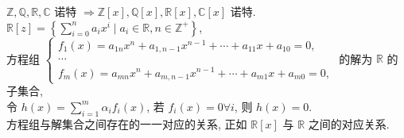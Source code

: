 \documentclass{note}
\begin{document}
\begin{eg}
    $\mathbb{Z},\mathbb{Q},\mathbb{R},\mathbb{C}$ 诺特 $\Longrightarrow\mathbb{Z}[x],\mathbb{Q}[x],\mathbb{R}[x],\mathbb{C}[x]$ 诺特.\\
    $\mathbb{R}[z]=\left\{\sum_{i=0}^na_ix^i\mid a_i\in\mathbb{R},n\in\mathbb{Z}^+\right\}$,\\
    方程组 $\left\{\begin{array}{l}
        f_1(x)=a_{1n}x^n+a_{1,n-1}x^{n-1}+\cdots+a_{11}x+a_{10}=0,\\
        \cdots\\
        f_m(x)=a_{mn}x^n+a_{m,n-1}x^{n-1}+\cdots+a_{m1}x+a_{m0}=0,
    \end{array}\right.$ 的解为 $\mathbb{R}$ 的子集合,\\
    令 $h(x)=\sum_{i=1}^m\alpha_if_i(x)$, 若 $f_i(x)=0\forall i$, 则 $h(x)=0$.\\
    方程组与解集合之间存在的一一对应的关系, 正如 $\mathbb{R}[x]$ 与 $\mathbb{R}$ 之间的对应关系.
\end{eg}
\ifx\allfiles\undefined
\end{document}
